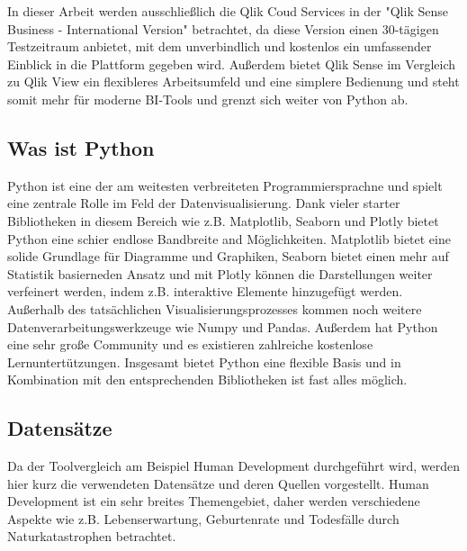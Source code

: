 \documentclass[12pt]{article}
\begin{document}
	In dieser Arbeit werden ausschließlich die Qlik Coud Services in der "Qlik Sense Business - International Version" betrachtet, da diese Version einen 30-tägigen Testzeitraum anbietet, mit dem unverbindlich und kostenlos ein umfassender Einblick in die Plattform gegeben wird. Außerdem bietet Qlik Sense im Vergleich zu Qlik View ein flexibleres Arbeitsumfeld und eine simplere Bedienung und steht somit mehr für moderne BI-Tools und grenzt sich weiter von Python ab.
	
	\subsection{Was ist Python}
	Python ist eine der am weitesten verbreiteten Programmiersprachne und spielt eine zentrale Rolle im Feld der Datenvisualisierung. Dank vieler starter Bibliotheken in diesem Bereich wie z.B. Matplotlib, Seaborn und Plotly bietet Python eine schier endlose Bandbreite and Möglichkeiten. Matplotlib bietet eine solide Grundlage für Diagramme und Graphiken, Seaborn bietet einen mehr auf Statistik basierneden Ansatz und mit Plotly können die Darstellungen weiter verfeinert werden, indem z.B. interaktive Elemente hinzugefügt werden. Außerhalb des tatsächlichen Visualisierungsprozesses kommen noch weitere Datenverarbeitungswerkzeuge wie Numpy und Pandas. Außerdem hat Python eine sehr große Community und es existieren zahlreiche kostenlose Lernuntertützungen.
	Insgesamt bietet Python eine flexible Basis und in Kombination mit den entsprechenden Bibliotheken ist fast alles möglich.
	
	\subsection{Datensätze} %
	Da der Toolvergleich am Beispiel Human Development durchgeführt wird, werden hier kurz die verwendeten Datensätze und deren Quellen vorgestellt.
	Human Development ist ein sehr breites Themengebiet, daher werden verschiedene Aspekte wie z.B. Lebenserwartung, Geburtenrate und Todesfälle durch Naturkatastrophen betrachtet.
	
\end{document}
